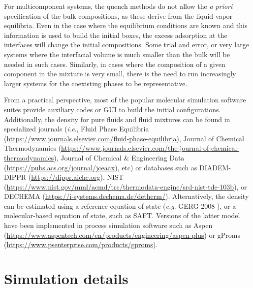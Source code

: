 \documentclass[9pt,bestpractices]{livecoms}
\begin{document}
For multicomponent systems, the quench methods do not allow the \textit{a
priori} specification of the bulk compositions, as these derive from the
liquid-vapor equilibria. Even in the case where the equilibrium conditions are
known and this information is used to build the initial boxes, the excess
adsorption at the interfaces will change the initial compositions. Some trial
and error, or very large systems where the interfacial volume is much smaller
than the bulk will be needed in such cases. Similarly, in cases where the
composition of a given component in the mixture is very small, there is the
need to run increasingly larger systems for the coexisting phases to be
representative.

From a practical perspective, most of the popular molecular simulation software
suites provide auxiliary codes or GUI to build the initial configurations.
Additionally, the density for pure fluids and fluid mixtures can be found in
specialized journals (\textit{i.e}., Fluid Phase Equilibria (\url{https://www.journals.elsevier.com/fluid-phase-equilibria}),
Journal of Chemical Thermodynamics (\url{https://www.journals.elsevier.com/the-journal-of-chemical-thermodynamics}),
Journal of Chemical \& Engineering Data (\url{https://pubs.acs.org/journal/jceaax}),
etc)
or databases such as DIADEM-DIPPR (\url{https://dippr.aiche.org}),
NIST \citep{lemmon2013} (\url{https://www.nist.gov/mml/acmd/trc/thermodata-engine/srd-nist-tde-103b}),
or DECHEMA (\url{https://i-systems.dechema.de/detherm/}).
Alternatively, the density can be estimated using a reference equation of state
(\textit{e.g}. GERG-2008 \citep{kunz2012}),
or a molecular-based equation of
state, such as SAFT\citep{lafitte2013}.
Versions of the latter model have been implemented in process simulation
software such as Aspen (\url{https://www.aspentech.com/en/products/engineering/aspen-plus})
or gProms (\url{https://www.psenterprise.com/products/gproms}).

\section{Simulation details}
\end{document}
